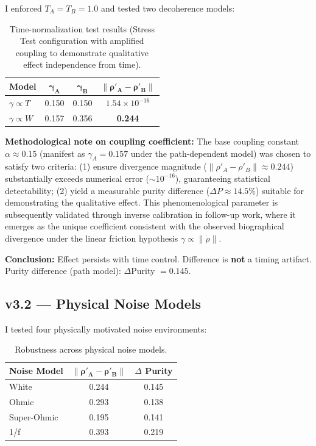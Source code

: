 \documentclass[11pt, onecolumn, letterpaper]{article}
\begin{document}
I enforced $T_A = T_B = 1.0$ and tested two decoherence models:

\begin{table}[h!]
\centering
\begin{tabular}{l c c c}
\toprule
\textbf{Model} & $\boldsymbol{\gamma_A}$ & $\boldsymbol{\gamma_B}$ & $\boldsymbol{\|\rho'_A - \rho'_B\|}$ \\
\midrule
$\gamma \propto T$ & 0.150 & 0.150 & $1.54 \times 10^{-16}$ \\
$\gamma \propto W$ & 0.157 & 0.356 & \textbf{0.244} \\
\bottomrule
\end{tabular}
\caption{Time-normalization test results (Stress Test configuration with amplified coupling to demonstrate qualitative effect independence from time).}
\label{tab:time_norm}
\end{table}

\noindent\textbf{Methodological note on coupling coefficient:} The base coupling constant $\alpha \approx 0.15$ (manifest as $\gamma_A = 0.157$ under the path-dependent model) was chosen to satisfy two criteria: (1) ensure divergence magnitude ($\|\rho'_A - \rho'_B\| \approx 0.244$) substantially exceeds numerical error ($\sim 10^{-16}$), guaranteeing statistical detectability; (2) yield a measurable purity difference ($\Delta P \approx 14.5\%$) suitable for demonstrating the qualitative effect. This phenomenological parameter is subsequently validated through inverse calibration in follow-up work, where it emerges as the unique coefficient consistent with the observed biographical divergence under the linear friction hypothesis $\gamma \propto \|\dot{\rho}\|$.

\noindent\textbf{Conclusion:} Effect persists with time control. Difference is \textbf{not} a timing artifact. Purity difference (path model): $\Delta$Purity $= 0.145$.

\subsection{v3.2 --- Physical Noise Models}
I tested four physically motivated noise environments:

\begin{table}[h!]
\centering
\begin{tabular}{l c c}
\toprule
\textbf{Noise Model} & $\boldsymbol{\|\rho'_A - \rho'_B\|}$ & \textbf{$\Delta$ Purity} \\
\midrule
White & 0.244 & 0.145 \\
Ohmic & 0.293 & 0.138 \\
Super-Ohmic & 0.195 & 0.141 \\
1/f & 0.393 & 0.219 \\
\bottomrule
\end{tabular}
\caption{Robustness across physical noise models.}
\label{tab:noise_models}
\end{table}
\end{document}

